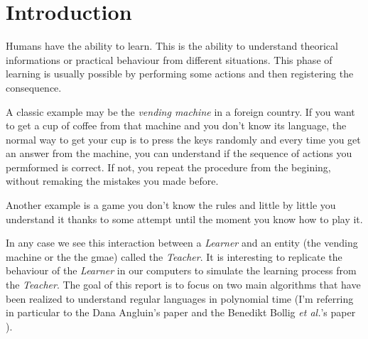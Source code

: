 \section{Introduction}




Humans have the ability to learn. This is the ability to understand theorical informations or practical behaviour from different situations. This phase of learning is usually possible by performing some actions and then registering the consequence.

A classic example may be the \textit{vending machine} in a foreign country. If you want to get a cup of coffee from that machine and you don't know its language, the normal way to get your cup is to press the keys randomly and every time you get an answer from the machine, you can understand if the sequence of actions you permformed is correct. If not, you repeat the procedure from the begining, without remaking the mistakes you made before.

Another example is a game you don't know the rules and little by little you understand it thanks to some attempt until the moment you know how to play it.

In any case we see this interaction between a \textit{Learner} and an entity (the vending machine or the the gmae) called the \textit{Teacher}. It is interesting to replicate the behaviour of the \textit{Learner} in our computers to simulate the learning process from the \textit{Teacher}. The goal of this report is to focus on two main algorithms that have been realized to understand regular languages in polynomial time (I'm referring in particular to the Dana Angluin's paper \cite{LPaper} and the Benedikt Bollig \textit{et al.}'s paper \cite{NLPaper}).

